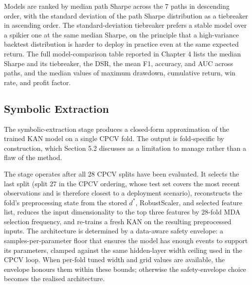 Models are ranked by median path Sharpe across the 7 paths in descending order, with the standard deviation of the path Sharpe distribution as a tiebreaker in ascending order. The standard-deviation tiebreaker prefers a stable model over a spikier one at the same median Sharpe, on the principle that a high-variance backtest distribution is harder to deploy in practice even at the same expected return. The full model-comparison table reported in Chapter 4 lists the median Sharpe and its tiebreaker, the DSR, the mean F1, accuracy, and AUC across paths, and the median values of maximum drawdown, cumulative return, win rate, and profit factor.


\subsection{Symbolic Extraction}\label{subsec:symbolic}

The symbolic-extraction stage produces a closed-form approximation of the trained KAN model \citep{liu_kan_2024} on a single CPCV fold. The output is fold-specific by construction, which Section 5.2 discusses as a limitation to manage rather than a flaw of the method.

The stage operates after all 28 CPCV splits have been evaluated. It selects the last split (split 27 in the CPCV ordering, whose test set covers the most recent observations and is therefore closest to a deployment scenario), reconstructs the fold's preprocessing state from the stored $d^{\ast}$, RobustScaler, and selected feature list, reduces the input dimensionality to the top three features by 28-fold MDA selection frequency, and re-trains a fresh KAN on the resulting preprocessed inputs. The architecture is determined by a data-aware safety envelope: a samples-per-parameter floor that ensures the model has enough events to support its parameters, clamped against the same hidden-layer width ceiling used in the CPCV loop. When per-fold tuned width and grid values are available, the envelope honours them within these bounds; otherwise the safety-envelope choice becomes the realised architecture.

